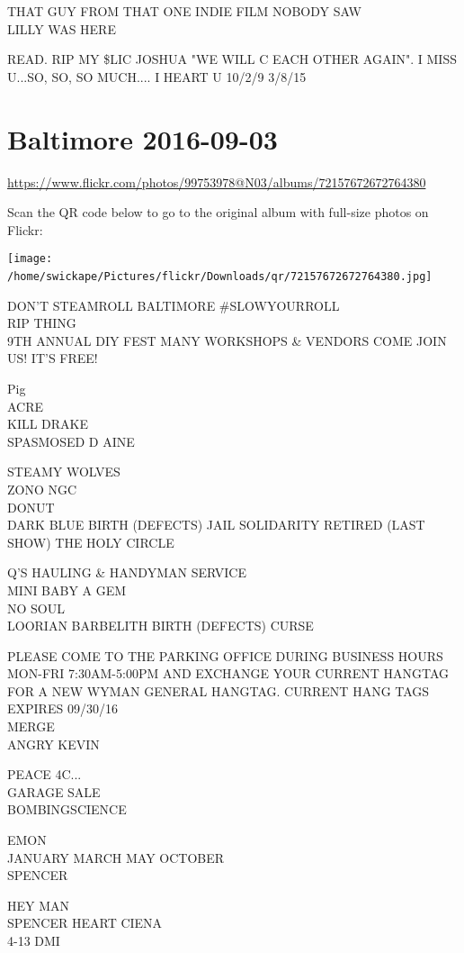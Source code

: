 \documentclass[10pt,letterpaper]{article}
\begin{document}
THAT GUY FROM THAT ONE INDIE FILM NOBODY SAW\\
LILLY WAS HERE

READ.  RIP MY \$LIC JOSHUA "WE WILL C EACH OTHER AGAIN".  I MISS U...SO, SO, SO MUCH.... I HEART U 10/2/9 3/8/15
\

\section*{Baltimore 2016-09-03}

\url{https://www.flickr.com/photos/99753978@N03/albums/72157672672764380}

Scan the QR code below to go to the original album with full-size photos on Flickr:

\texttt{[image: /home/swickape/Pictures/flickr/Downloads/qr/72157672672764380.jpg]}
\

DON'T STEAMROLL BALTIMORE \#SLOWYOURROLL\\
RIP THING\\
9TH ANNUAL DIY FEST MANY WORKSHOPS \& VENDORS COME JOIN US!  IT'S FREE!

Pig\\
ACRE\\
KILL DRAKE\\
SPASMOSED D AINE

STEAMY WOLVES\\
ZONO NGC\\
DONUT\\
DARK BLUE BIRTH (DEFECTS) JAIL SOLIDARITY RETIRED (LAST SHOW) THE HOLY CIRCLE

Q'S HAULING \& HANDYMAN SERVICE\\
MINI BABY A GEM\\
NO SOUL\\
LOORIAN BARBELITH BIRTH (DEFECTS) CURSE

PLEASE COME TO THE PARKING OFFICE DURING BUSINESS HOURS MON{-}FRI 7:30AM{-}5:00PM AND EXCHANGE YOUR CURRENT HANGTAG FOR A NEW WYMAN GENERAL HANGTAG.  CURRENT HANG TAGS EXPIRES 09/30/16\\
MERGE\\
ANGRY KEVIN

PEACE 4C...\\
GARAGE SALE\\
BOMBINGSCIENCE

EMON\\
JANUARY MARCH MAY OCTOBER\\
SPENCER

HEY MAN\\
SPENCER HEART CIENA\\
4{-}13 DMI
\end{document}
